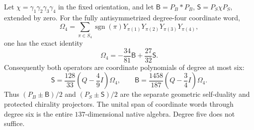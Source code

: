 \documentclass[11pt]{article}
\begin{document}
\begin{theorem}
\label{p1:thm:v226-chirality}
Let $\chi=\gamma_1\gamma_2\gamma_3\gamma_4$ in the fixed orientation, and
let $\mathsf B=P_B*P_B$, $\mathsf S=P_S\chi P_S$, extended by zero.
For the fully antisymmetrized degree-four coordinate word,
\[
 \Omega_4=\sum_{\pi\in S_4}\operatorname{sgn}(\pi)
             Y_{\pi(1)}Y_{\pi(2)}Y_{\pi(3)}Y_{\pi(4)},
\]
one has the exact identity
\begin{equation}\label{p1:eq:v226-omega}
 \Omega_4=-\frac{34}{81}\mathsf B+\frac{27}{32}\mathsf S.
\end{equation}
Consequently both operators are coordinate polynomials of degree at most six:
\begin{equation}\label{p1:eq:v226-chiral-recovery}
 \boxed{\mathsf S=\frac{128}{33}\left(Q-\frac49I\right)\Omega_4,
 \qquad
 \mathsf B=\frac{1458}{187}\left(Q-\frac34I\right)\Omega_4.}
\end{equation}
Thus $(P_B\pm\mathsf B)/2$ and $(P_S\pm\mathsf S)/2$ are the separate
geometric self-duality and protected chirality projectors. The unital span
of coordinate words through degree six is the entire $137$-dimensional
native algebra. Degree five does not suffice.
\end{theorem}
\end{document}
